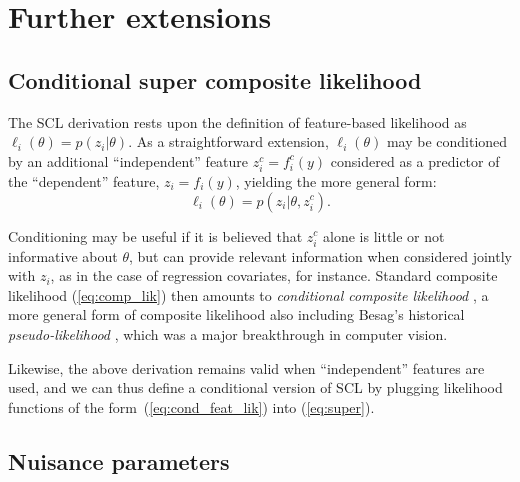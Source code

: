 \documentclass[english]{scrartcl}
\begin{document}


\section{Further extensions}

\subsection{Conditional super composite likelihood}
\label{sec:conditional}

The SCL derivation rests upon the definition of feature-based likelihood as $\ell_i(\theta)=p(z_i|\theta)$. As a straightforward  extension, $\ell_i(\theta)$ may be conditioned by an additional ``independent'' feature $z^c_i = f^c_i(y)$ considered as a predictor of the ``dependent'' feature, $z_i=f_i(y)$, yielding the more general form:
\begin{equation}
\label{eq:cond_feat_lik}
\ell_i(\theta) = p(z_i|\theta,z^c_i).
\end{equation}

Conditioning may be useful if it is believed that $z^c_i$ alone is little or not informative about $\theta$, but can provide relevant information when considered jointly with $z_i$, as in the case of regression covariates, for instance. Standard composite likelihood (\ref{eq:comp_lik}) then amounts to {\em conditional composite likelihood} \cite{Varin-11}, a more general form of composite likelihood also including Besag's historical {\em pseudo-likelihood} \cite{Besag-74}, which was a major breakthrough in computer vision. 

Likewise, the above derivation remains valid when ``independent'' features are used, and we can thus define a conditional version of SCL by plugging likelihood functions of the form~(\ref{eq:cond_feat_lik}) into (\ref{eq:super}).


\subsection{Nuisance parameters}
\label{sec:nuisance_params}
\end{document}
